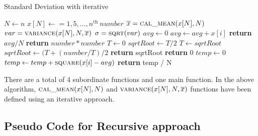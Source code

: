 \documentclass{scrartcl}
\begin{document}
\begin{algorithm}
\caption{Standard Deviation with iterative}\label{alg:Standard Deviation with iterative}
\begin{algorithmic}
    \State $N \gets n$
    \State $x[N] \gets  = {1, 5, ..., n^{\text{th}}\ number}$
    \State $\overline{x} = \Call{cal\_mean}{x[N],N}$
    \State $var = \Call{variance}{x[N],N,\overline{x}}$
    \State $\sigma = \Call{sqrt}{var}$
\EndFunction
{}
    \State $avg \gets 0$
        \State $avg \gets avg + x[i]$
    \EndFor
    \State \textbf{return} {$avg / N$} 
\EndFunction
{} 
    \State \textbf{return} {$number * number$} 
\EndFunction
{}
        \State $T \gets 0$
        \State $sqrtRoot \gets T/2$
        \Do
            \State $T \gets sqrtRoot$
            \State $sqrtRoot \gets (T + (number/T)/2$
        \State \textbf{return} {sqrtRoot}
    \Else
       \State \textbf{return} {0} 
    \EndIf 
\EndFunction
{}
    \State $temp \gets 0$
        \State $temp \gets temp + \Call{square}{x[i] - avg}$
    \EndFor 
    \State \textbf{return} {temp / N}
\EndFunction
\end{algorithmic}
\end{algorithm}

\begin{spacing}{1.5}
\begin{Large}
There are a total of 4 subordinate functions and one main function. In the above algorithm, $\Call{cal\_mean}{x[N],N}$ and $\Call{variance}{x[N],N,\overline{x}}$ functions have been defined using an iterative approach.  
\end{Large}
\end{spacing}

\subsection{Pseudo Code for Recursive approach}
\end{document}
